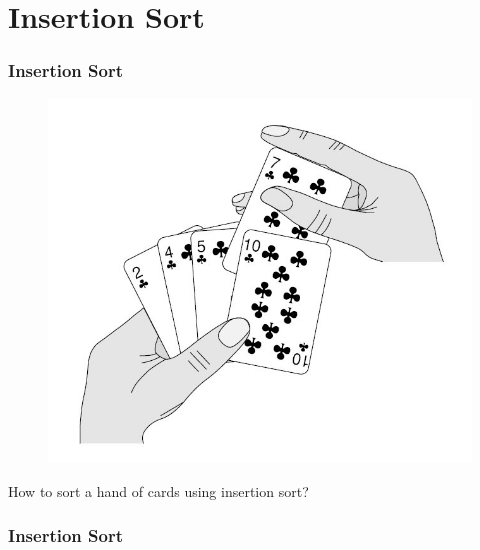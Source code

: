 \documentclass{beamer}
\begin{document}
\section{Insertion Sort}
\begin{frame}
    \frametitle{Insertion Sort}
    \begin{figure}[h]
        \includegraphics[scale=0.3]{insertion/cards}
    \end{figure}
    \begin{center}
        How to sort a hand of cards using insertion sort?
    \end{center}
\end{frame}
\begin{frame}
    \frametitle{Insertion Sort}
    \begin{algorithm}[H]
        
    \end{algorithm}
\end{frame}
\end{document}

